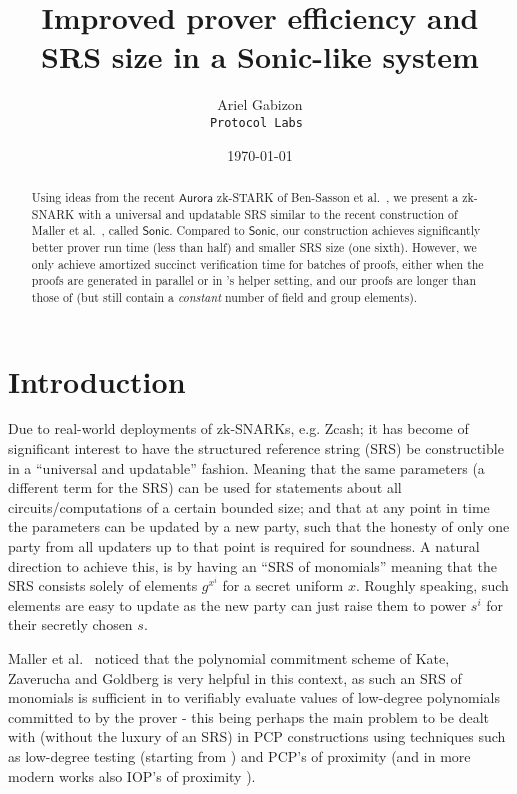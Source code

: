 \documentclass[11pt]{article}
\title{%
Improved prover efficiency and SRS size in a Sonic-like system}
\date{\today}
\author{Ariel Gabizon\\ \tt{Protocol Labs} }
\date{}
\numberwithin{figure}{section} %
\newcommand{\sonic}{\ensuremath{\mathsf{Sonic}}\xspace}
\newcommand{\aurora}{\ensuremath{\mathsf{Aurora}}\xspace}
\begin{document}
\maketitle

\begin{abstract}
Using ideas from the recent \aurora zk-STARK of Ben-Sasson et al.\ \cite{aurora}, we present a zk-SNARK with a universal and updatable SRS similar to the recent construction of Maller et al.\ \cite{sonic}, called \sonic.
Compared to \sonic, our construction achieves significantly better prover run time (less than half) and smaller SRS size (one sixth). However, we only achieve amortized succinct verification time for batches of proofs, either when the proofs are generated in parallel or in \cite{sonic}'s helper setting, and our proofs are longer than those of \cite{sonic} (but still contain a \emph{constant} number of field and group elements).
\end{abstract}


\section{Introduction}
Due to real-world deployments of zk-SNARKs, e.g. Zcash; it has become of significant interest to have the structured reference string (SRS) be constructible in a ``universal and updatable'' fashion. Meaning that the same parameters (a different term for the SRS) can be used for statements about all circuits/computations of a certain bounded size; and that at any point in time the parameters can be updated by a new party, such that the honesty of only one party from all updaters up to that point is required for soundness.
A natural direction to achieve this, is by having an ``SRS of monomials'' meaning that the SRS consists solely of elements ${g^{x^i}}$ for a secret uniform $x$. Roughly speaking, such elements are easy to update as the new party can just raise them to power $s^i$ for their secretly chosen $s$.

Maller et al.\ \cite{sonic} noticed that the polynomial commitment scheme of Kate, Zaverucha and Goldberg \cite{kate} is very helpful in this context, as such an SRS of monomials is sufficient in \cite{kate} to verifiably evaluate values of low-degree polynomials committed to by the prover - this being perhaps the main problem to be dealt with (without the luxury of an SRS) in PCP constructions using techniques such as low-degree testing (starting from \cite{BFL}) and PCP's of proximity \cite{BSS} (and in more modern works also IOP's of proximity \cite{BCGRS}).
\end{document}
